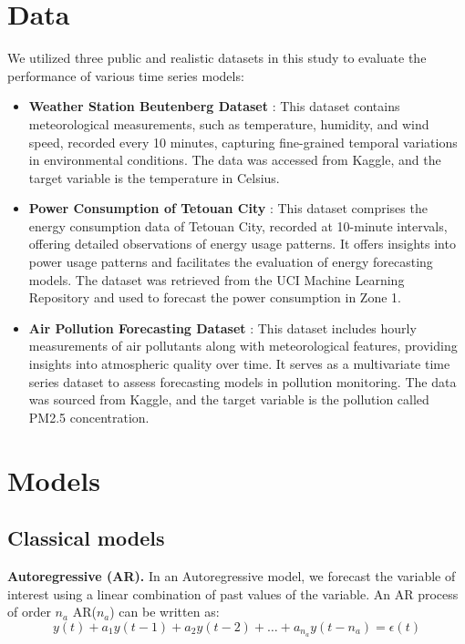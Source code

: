 \documentclass{scrartcl}
\begin{document}
 
\section{Data}
We utilized three public and realistic datasets in this study to evaluate the performance of various time series models:
\begin{itemize}
    \item \textbf{Weather Station Beutenberg Dataset} \cite{weather2020}: This dataset contains meteorological measurements, such as temperature, humidity, and wind speed, recorded every 10 minutes, capturing fine-grained temporal variations in environmental conditions. The data was accessed from Kaggle, and the target variable is the temperature in Celsius. 
    
    \item \textbf{Power Consumption of Tetouan City} \cite{power_consumption_of_tetouan_city_849}: This dataset comprises the energy consumption data of Tetouan City, recorded at 10-minute intervals,  offering detailed observations of energy usage patterns. It offers insights into power usage patterns and facilitates the evaluation of energy forecasting models. The dataset was retrieved from the UCI Machine Learning Repository and used to forecast the power consumption in Zone 1.
    
    \item \textbf{Air Pollution Forecasting Dataset} \cite{kaggle_lstm_dataset}: This dataset includes hourly measurements of air pollutants along with meteorological features, providing insights into atmospheric quality over time. It serves as a multivariate time series dataset to assess forecasting models in pollution monitoring. The data was sourced from Kaggle, and the target variable is the pollution called PM2.5 concentration.
\end{itemize}


\section{Models}
\subsection{Classical models}
\textbf{Autoregressive (AR).}
In an Autoregressive model, we forecast the variable of interest using a linear combination of past values of the variable.
An AR process of order \( n_a \) AR(\( n_a \))  can be written as:
\[
y(t) + a_1 y(t-1) + a_2 y(t-2) + \dots + a_{n_a} y(t-{n_a}) = \epsilon(t)
\]
\end{document}
